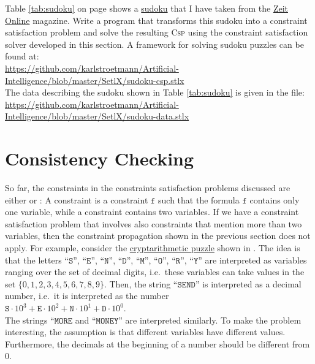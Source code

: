 \exercise
Table \ref{tab:sudoku} on page \pageref{tab:sudoku} shows a \href{https://en.wikipedia.org/wiki/Sudoku}{sudoku}
that I have taken from the
\href{http://sudoku.zeit.de/cgi-bin/sudoku/sudoku_kd_app_2016.pl?action=level&kd_nr=24091123601092&year=2018&month=03&day=23&level=-c+5}{Zeit Online}
magazine.  Write a program that transforms this sudoku into a constraint satisfaction problem and solve the
resulting \textsc{Csp} using the constraint satisfaction solver developed in this section.  A framework for solving sudoku
puzzles can be found at:
\\[0.2cm]
\hspace*{1.3cm}
\href{https://github.com/karlstroetmann/Artificial-Intelligence/blob/master/SetlX/sudoku-csp.stlx}{https://github.com/karlstroetmann/Artificial-Intelligence/blob/master/SetlX/sudoku-csp.stlx}
\\[0.2cm]
The data describing the sudoku shown in Table \ref{tab:sudoku} is given in the file:
\\[0.2cm]
\hspace*{1.3cm}
\href{https://github.com/karlstroetmann/Artificial-Intelligence/blob/master/SetlX/sudoku-data.stlx}{https://github.com/karlstroetmann/Artificial-Intelligence/blob/master/SetlX/sudoku-data.stlx}
\eoxs

\section{Consistency Checking \label{sec:consistency}}
So far, the constraints in the constraints satisfaction problems discussed are either  
or :  A  constraint is a constraint $\texttt{f}$
such that the formula $\texttt{f}$ contains only one variable, while a  constraint
contains two variables.  If we have a constraint satisfaction problem that involves also constraints that
mention more than two variables, then the constraint propagation shown in the previous section does not apply.
For example, consider the \href{https://en.wikipedia.org/wiki/Verbal_arithmetic}{cryptarithmetic puzzle} shown
in .  The idea is that the letters 
``$\texttt{S}$'', ``$\texttt{E}$'', ``$\texttt{N}$'', ``$\texttt{D}$'', ``$\texttt{M}$'', ``$\texttt{O}$'', ``$\texttt{R}$'', ``$\texttt{Y}$'' 
are interpreted as variables ranging over the set of decimal digits, i.e.~these variables can take values in
the set $\{0,1,2,3,4,5,6,7,8,9\}$.  Then, the string ``$\texttt{SEND}$'' is interpreted as a decimal number,
i.e.~it is interpreted as the number
\\[0.2cm]
\hspace*{1.3cm}
$\texttt{S} \cdot 10^3 + \texttt{E} \cdot 10^2 + \texttt{N} \cdot 10^1 + \texttt{D} \cdot 10^0$.
\\[0.2cm]
The strings ``$\texttt{MORE}$ and ``$\texttt{MONEY}$'' are interpreted similarly. To make the problem
interesting, the assumption is that different variables have different values.  Furthermore, the
decimals at the beginning of a number should be different from $0$.


